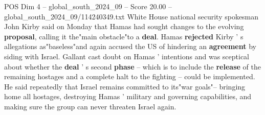 \begin{textsample}{POS Dim 4 – global\_south\_2024\_09 – Score 20.00 – global\_south\_2024\_09/114240349.txt}
White House national security spokesman John Kirby said on Monday that Hamas had sought changes to the evolving \textbf{proposal}, calling it the"main obstacle"to a \textbf{deal}.
Hamas \textbf{rejected} Kirby ' s allegations as"baseless"and again accused the US of hindering an \textbf{agreement} by siding with Israel.
Gallant cast doubt on Hamas ' intentions and was sceptical about whether the \textbf{deal} ' s second \textbf{phase} -- which is to include the \textbf{release} of the remaining hostages and a complete halt to the fighting -- could be implemented.
He said repeatedly that Israel remains committed to its"war goals"-- bringing home all hostages, destroying Hamas ' military and governing capabilities, and making sure the group can never threaten Israel again.

\end{textsample}
